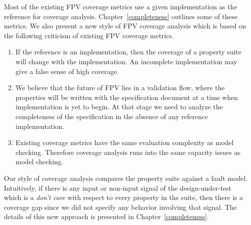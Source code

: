Most of the existing FPV coverage metrics use a given implementation as the
reference for coverage analysis. Chapter~\ref{completeness} outlines some
of these metrics. We also present a new style of FPV coverage analysis which
is based on the following criticism of existing FPV coverage metrics.
\begin{enumerate}

\item If the reference is an implementation, then the coverage of a property
	suite will change with the implementation. An incomplete implementation
	may give a false sense of high coverage.

\item We believe that the future of FPV lies in a validation flow, where the
	properties will be written with the specification document at a time
	when implementation is yet to begin. At that stage we need to analyze
	the completeness of the specification in the absence of any reference
	implementation.

\item Existing coverage metrics have the same evaluation complexity as
	model checking. Therefore coverage analysis runs into the same
	capacity issues as model checking.

\end{enumerate}
Our style of coverage analysis compares the property suite against a fault
model. Intuitively, if there is any input or non-input signal of the
design-under-test which is a {\em don't care} with respect to every property
in the suite, then there is a coverage gap since we did not specify any
behavior involving that signal. The details of this new approach is 
presented in Chapter~\ref{completeness}. 

